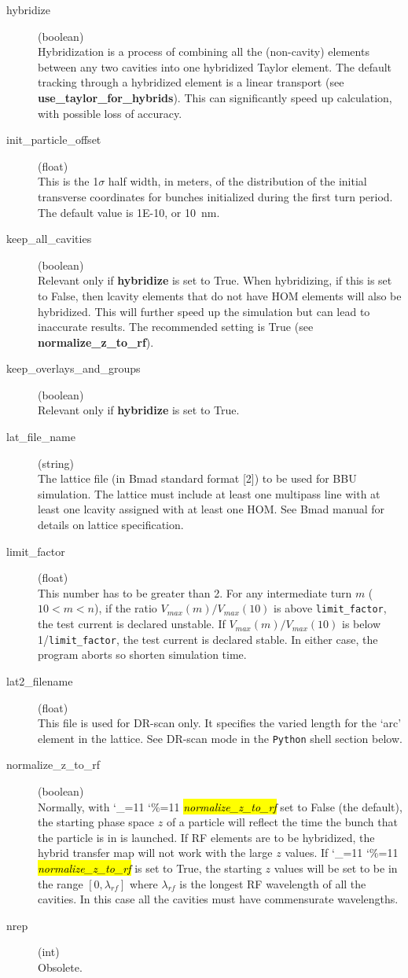 \documentclass{hitec}
\newcommand\dottcmd[1]{\hl{\em#1}\endgroup}
\newcommand{\vn}{\begingroup\catcode`\_=11 \catcode`\%=11 \dottcmd}
\newcommand{\Newline}{\hfil \\}
\begin{document}
\begin{description}
\item[hybridize] (boolean) \Newline
Hybridization is a process of combining all the (non-cavity) elements between any two cavities into one hybridized Taylor element. The default tracking through a hybridized element is a linear transport (see \textbf{use_taylor_for_hybrids}). This can significantly speed up calculation, with possible loss of accuracy. 
%
\item[init_particle_offset] (float) \Newline
This is the 1$\sigma$ half width, in meters, of the distribution of the initial transverse coordinates
for bunches initialized during the first turn period. The default value is 1E-10, or 10~nm.
%
\item[keep_all_cavities] (boolean) \Newline
Relevant only if \textbf{hybridize} is set to True. When hybridizing, if this is set to False, then lcavity elements that do not have HOM elements will also be hybridized. This will further speed up the simulation but can lead to inaccurate results. The recommended setting is True (see \textbf{normalize_z_to_rf}).
%
\item[keep_overlays_and_groups] (boolean) \Newline
Relevant only if \textbf{hybridize} is set to True. 
%
\item[lat_file_name] (string) \Newline
The lattice file (in Bmad standard format [2]) to be used for BBU simulation. The lattice must include at least one multipass line with at least one lcavity assigned with at least one HOM. See Bmad manual for details on lattice specification.
%
\item[limit_factor] (float) \Newline
This number has to be greater than 2.
For any intermediate turn $m$ ($10<m<n$), if the ratio $V_{max}(m)/V_{max}(10)$ is above \texttt{limit_factor}, the test current is declared unstable. If $V_{max}(m)/V_{max}(10)$ is below 1/\texttt{limit_factor}, the test current is declared stable. In either case, the program aborts so shorten simulation time.
%
\item[lat2_filename] (float) \Newline
This file is used for DR-scan only. It specifies the varied length for the `arc' element in the lattice. See DR-scan mode in the \texttt{Python} shell section below.
%
\item[normalize_z_to_rf] (boolean)\Newline
Normally, with \vn{normalize_z_to_rf} set to False (the default), the starting phase space $z$ of a
particle will reflect the time the bunch that the particle is in is launched. If RF elements are to
be hybridized, the hybrid transfer map will not work with the large $z$ values. If \vn{normalize_z_to_rf} 
is set to True, the starting $z$ values will be set to be in the range $[0, \lambda_{rf}]$ where $\lambda_{rf}$ is the
longest RF wavelength of all the cavities. In this case all the cavities must have commensurate wavelengths.
%
\item[nrep] (int) \Newline
Obsolete. 


\end{description}
\end{document}
